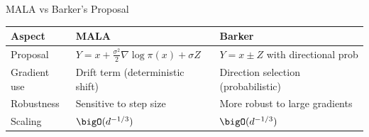 \begin{frame}{MALA vs Barker's Proposal}
	\begin{table}[h]
		\centering
		\begin{tabular}{lll}
			\toprule
			\textbf{Aspect} & \textbf{MALA}                                           & \textbf{Barker}                     \\
			\midrule
			Proposal        & $Y = x + \frac{\sigma^2}{2}\nabla\log\pi(x) + \sigma Z$ & $Y = x \pm Z$ with directional prob \\
			Gradient use    & Drift term (deterministic shift)                        & Direction selection (probabilistic) \\
			Robustness      & Sensitive to step size                                  & More robust to large gradients      \\
			Scaling         & $\bigO(d^{-1/3})$                                       & $\bigO(d^{-1/3})$                   \\
			\bottomrule
		\end{tabular}
	\end{table}
\end{frame}
